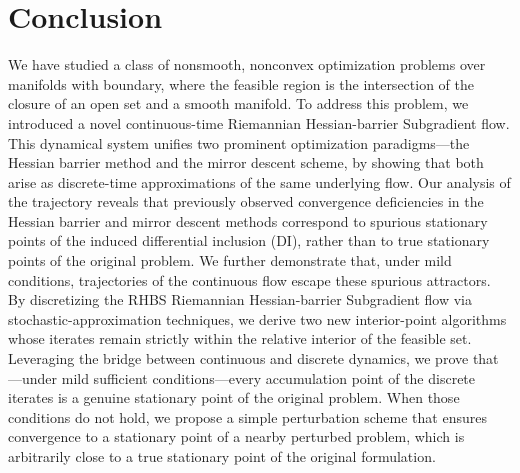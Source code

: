 \documentclass[11pt]{article}
\newcommand{\cM}{\mathcal M}
\def\norm#1{\left\|#1\right\|}
\begin{document}

\section{Conclusion}

We have studied a class of nonsmooth, nonconvex optimization problems over manifolds with boundary, where the feasible region is the intersection of the closure of an open set and a smooth manifold. To address this problem, we introduced a novel continuous-time Riemannian Hessian-barrier Subgradient flow. This dynamical system unifies two prominent optimization paradigms—the Hessian barrier method and the mirror descent scheme, by showing that both arise as discrete-time approximations of the same underlying flow. Our analysis of the trajectory reveals that previously observed convergence deficiencies in the Hessian barrier and mirror descent methods correspond to spurious stationary points of the induced differential inclusion (DI), rather than to true stationary points of the original problem. We further demonstrate that, under mild conditions, trajectories of the continuous flow escape these spurious attractors. By discretizing the RHBS Riemannian Hessian-barrier Subgradient flow via stochastic-approximation techniques, we derive two new interior-point algorithms whose iterates remain strictly within the relative interior of the feasible set. Leveraging the bridge between continuous and discrete dynamics, we prove that—under mild sufficient conditions—every accumulation point of the discrete iterates is a genuine stationary point of the original problem. When those conditions do not hold, we propose a simple perturbation scheme that ensures convergence to a stationary point of a nearby perturbed problem, which is arbitrarily close to a true stationary point of the original formulation.


\end{document}
